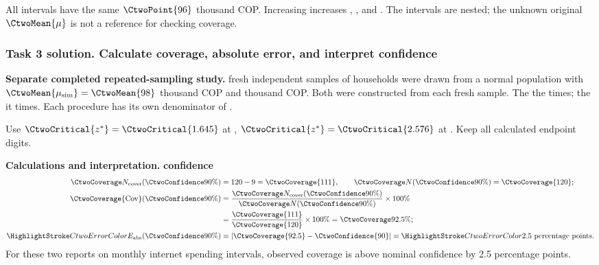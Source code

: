 All intervals have the same  $\CtwoPoint{96}$ thousand COP. Increasing  increases , , and . The intervals are nested; the unknown original $\CtwoMean{\mu}$ is not a reference for checking coverage.
\par\vspace{3mm}
\clearpage
\subsubsection*{Task 3 solution. Calculate coverage, absolute error, and interpret confidence}
\label{sol:c2-advanced-b-c}
\textbf{Separate completed repeated-sampling study.}  fresh independent samples of  households were drawn from a normal population with  $\CtwoMean{\mu_{\rm sim}}=\CtwoMean{98}$ thousand COP and   thousand COP. Both  were constructed from each fresh sample.
The    the   times; the    it  times. Each procedure has its own denominator of .

Use $\CtwoCritical{z^*}=\CtwoCritical{1.645}$ at , $\CtwoCritical{z^*}=\CtwoCritical{2.576}$ at . Keep all calculated endpoint digits.

\textbf{Calculations and interpretation.}
\textbf{ confidence}\nopagebreak[4]
\begin{align*}
\CtwoCoverCount(\CtwoConfidence{90\%})&=120-9=\CtwoCoverage{111},
\qquad\CtwoTotalCount(\CtwoConfidence{90\%})=\CtwoCoverage{120};\\
\CtwoCoverage{\mathrm{Cov}}(\CtwoConfidence{90\%})
&=\frac{\CtwoCoverCount(\CtwoConfidence{90\%})}{\CtwoTotalCount(\CtwoConfidence{90\%})}\times100\%
\\
&=\frac{\CtwoCoverage{111}}{\CtwoCoverage{120}}\times100\%=\CtwoCoverage{92.5\%};\\
\CtwoError{E_{\rm abs}}(\CtwoConfidence{90\%})
&=\left|\CtwoCoverage{92.5}-\CtwoConfidence{90}\right|=\CtwoError{2.5}\ \text{percentage points}.
\end{align*}
For these two reports on monthly internet spending intervals, observed coverage is above nominal confidence by 2.5 percentage points.

